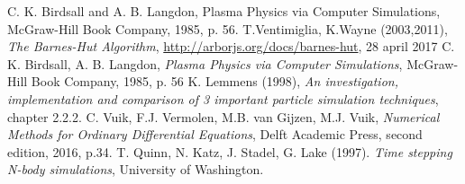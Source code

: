 \begin{thebibliography}{9}
C. K. Birdsall and A. B. Langdon, Plasma Physics via Computer Simulations, McGraw-Hill Book Company, 1985, p. 56.
T.Ventimiglia, K.Wayne (2003,2011), \textit{The Barnes-Hut Algorithm}, \url{http://arborjs.org/docs/barnes-hut}, 28 april 2017
C. K. Birdsall, A. B. Langdon, \textit{Plasma Physics via Computer Simulations}, McGraw-Hill Book Company, 1985, p. 56
K. Lemmens (1998), \textit{An investigation, implementation and comparison of 3 important particle simulation techniques}, chapter 2.2.2.
C. Vuik, F.J. Vermolen, M.B. van Gijzen, M.J. Vuik, \textit{Numerical Methods for Ordinary Differential Equations}, Delft Academic Press, second edition, 2016, p.34.
T. Quinn, N. Katz, J. Stadel, G. Lake (1997). \textit{Time stepping N-body simulations}, University of Washington.
\end{thebibliography}
